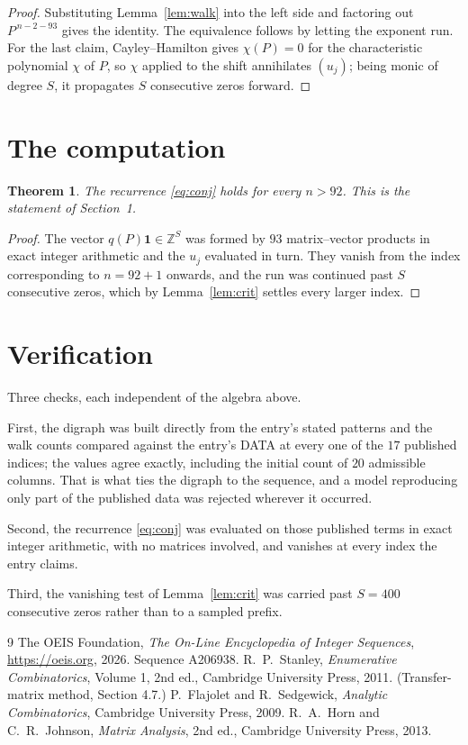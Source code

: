 \documentclass[11pt,a4paper]{article}
\theoremstyle{plain}
\newtheorem{theorem}{Theorem}
\theoremstyle{definition}
\begin{document}
\begin{proof}
Substituting Lemma~\ref{lem:walk} into the left side and factoring out
$P^{\,n-2-93}$ gives the identity. The equivalence follows by letting the exponent
run. For the last claim, Cayley--Hamilton gives $\chi(P)=0$ for the characteristic
polynomial $\chi$ of $P$, so $\chi$ applied to the shift annihilates $(u_j)$; being monic of
degree $S$, it propagates $S$ consecutive zeros forward.
\end{proof}

\section{The computation}

\begin{theorem}
The recurrence \eqref{eq:conj} holds for every $n>92$. This is the statement of
Section~1.
\end{theorem}

\begin{proof}
The vector $q(P)\mathbf{1}\in\mathbb{Z}^{S}$ was formed by $93$ matrix--vector
products in exact integer arithmetic and the $u_j$ evaluated in turn. They vanish from the
index corresponding to $n=92+1$ onwards, and the run was continued past $S$ consecutive
zeros, which by Lemma~\ref{lem:crit} settles every larger index.
\end{proof}

\section{Verification}

Three checks, each independent of the algebra above.

First, the digraph was built directly from the entry's stated patterns and the walk counts
compared against the entry's DATA at every one of the $17$ published indices; the
values agree exactly, including the initial count of $20$ admissible columns. That is
what ties the digraph to the sequence, and a model reproducing only part of the published
data was rejected wherever it occurred.

Second, the recurrence \eqref{eq:conj} was evaluated on those published terms in exact
integer arithmetic, with no matrices involved, and vanishes at every index the entry claims.

Third, the vanishing test of Lemma~\ref{lem:crit} was carried past $S=400$ consecutive
zeros rather than to a sampled prefix.

\begin{thebibliography}{9}
 The OEIS Foundation, \emph{The On-Line Encyclopedia of Integer
Sequences}, \url{https://oeis.org}, 2026. Sequence A206938.
 R.~P.~Stanley, \emph{Enumerative Combinatorics}, Volume 1, 2nd ed.,
Cambridge University Press, 2011. (Transfer-matrix method, Section 4.7.)
 P.~Flajolet and R.~Sedgewick, \emph{Analytic Combinatorics}, Cambridge
University Press, 2009.
 R.~A.~Horn and C.~R.~Johnson, \emph{Matrix Analysis}, 2nd ed., Cambridge
University Press, 2013.
\end{thebibliography}
\end{document}
